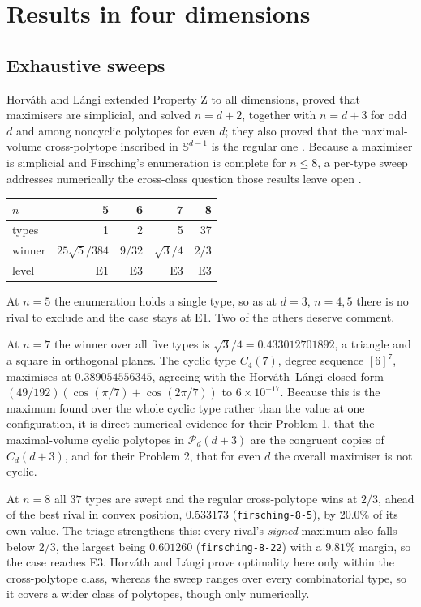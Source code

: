 \section{Results in four dimensions}
\label{sec:results4}

\subsection{Exhaustive sweeps}

Horv\'{a}th and L\'{a}ngi extended Property Z to all dimensions, proved that
maximisers are simplicial, and solved $n = d+2$, together with $n = d+3$ for
odd $d$ and among noncyclic polytopes for even $d$; they also proved that the
maximal-volume cross-polytope inscribed in $\mathbb{S}^{d-1}$ is the regular
one \cite{horvath-langi-2016}. Because a maximiser is simplicial and
Firsching's enumeration is complete for $n \leq 8$, a per-type sweep addresses
numerically the cross-class question those results leave open .

\begin{center}
\begin{tabular}{lrrrr}
  \toprule
  $n$ & 5 & 6 & 7 & 8 \\
  \midrule
  types  & 1 & 2 & 5 & 37 \\
  winner & $25\sqrt{5}/384$ & $9/32$ & $\sqrt{3}/4$ & $2/3$ \\
  level  & E1 & E3 & E3 & E3 \\
  \bottomrule
\end{tabular}
\end{center}

At $n = 5$ the enumeration holds a single type, so as at $d = 3$, $n = 4, 5$
there is no rival to exclude and the case stays at E1. Two of the others
deserve comment.

At $n = 7$ the winner over all five types is $\sqrt{3}/4 = 0.433012701892$, a
triangle and a square in orthogonal planes. The cyclic type $C_{4}(7)$, degree
sequence $[6]^{7}$, maximises at $0.389054556345$, agreeing with the
Horv\'{a}th--L\'{a}ngi closed form $(49/192)(\cos(\pi/7) + \cos(2\pi/7))$ to
$6 \times 10^{-17}$. Because this is the maximum found over the whole cyclic
type rather than the value at one configuration, it is direct numerical
evidence for their Problem 1, that the maximal-volume cyclic polytopes in
$\mathcal{P}_{d}(d+3)$ are the congruent copies of $C_{d}(d+3)$, and for their
Problem 2, that for even $d$ the overall maximiser is not cyclic.

At $n = 8$ all $37$ types are swept and the regular cross-polytope wins at
$2/3$, ahead of the best rival in convex position, $0.533173$
(\texttt{firsching-8-5}), by $20.0\%$ of its own value. The triage strengthens
this: every rival's \emph{signed} maximum also falls below $2/3$, the largest
being $0.601260$ (\texttt{firsching-8-22}) with a $9.81\%$ margin, so the case
reaches E3. Horv\'{a}th and L\'{a}ngi prove optimality here only within the
cross-polytope class, whereas the sweep ranges over every combinatorial type,
so it covers a wider class of polytopes, though only numerically.


